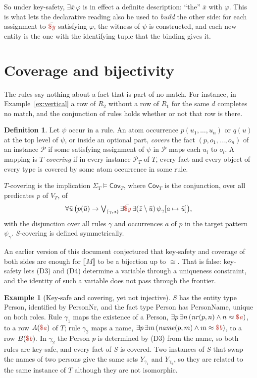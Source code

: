 \documentclass[11pt]{amsart}
\theoremstyle{definition}
\newtheorem{definition}{Definition}
\newtheorem{example}{Example}
\theoremstyle{remark}
\newcommand{\pop}{\mathcal{P}}
\newcommand{\sem}[1]{\llbracket #1 \rrbracket}
\newcommand{\dataEq}{\mathrel{\approx}}
\newcommand{\fv}[1]{\textcolor{BrickRed}{\$\mathit{#1}}}
\newcommand{\Cov}{\mathsf{Cov}}
\begin{document}
So under key-safety, $\exists \bar x\,\varphi$ is in effect a definite
description: ``the'' $\bar x$ with $\varphi$. This is what lets the
declarative reading also be used to \emph{build} the other side: for each
assignment to $\bar{\fv{y}}$ satisfying $\varphi$, the witness of $\psi$
is constructed, and each new entity is the one with the identifying tuple
that the binding gives it.

\section{Coverage and bijectivity}
\label{sec:coverage}

The rules say nothing about a fact that is part of no match. For instance,
in Example~\ref{ex:vertical} a row of $R_2$ without a row of $R_1$ for the
same $d$ completes no match, and the conjunction of rules holds whether or
not that row is there.

\begin{definition}
Let $\psi$ occur in a rule. An atom occurrence $p(u_1, \ldots, u_n)$ or
$q(u)$ at the top level of $\psi$, or inside an optional part, \emph{covers}
the fact $(p, o_1, \ldots, o_n)$ of an instance $\pop$ if some satisfying
assignment of $\psi$ in $\pop$ maps each $u_i$ to $o_i$. A mapping is
\emph{$T$-covering} if in every instance $\pop_T$ of $T$, every fact and
every object of every type is covered by some atom occurrence in some rule.
\end{definition}

$T$-covering is the implication $\Sigma_T \models \Cov_T$, where $\Cov_T$
is the conjunction, over all predicates $p$ of $V_T$, of
$$\forall \bar u\, \big( p(\bar u) \to \textstyle\bigvee_{(\gamma, a)}
  \exists \bar{\fv{y}}\, \exists (\bar z \setminus \bar u)\, \psi_\gamma
  [a \mapsto \bar u] \big),$$
with the disjunction over all rules $\gamma$ and occurrences $a$ of $p$ in
the target pattern $\psi_\gamma$. $S$-covering is defined symmetrically.

An earlier version of this document conjectured that key-safety and
coverage of both sides are enough for $\sem{M}$ to be a bijection up to
$\cong$. That is false: key-safety lets (D3) and (D4) determine a variable
through a uniqueness constraint, and the identity of such a variable does
not pass through the frontier.

\begin{example}[Key-safe and covering, yet not injective]
\label{ex:notinjective}
$S$ has the entity type Person, identified by PersonNr, and the fact type
Person has PersonName, unique on both roles. Rule $\gamma_1$ maps the
existence of a Person, $\exists p\, \exists n\, (\mathit{nr}(p, n) \wedge
n \dataEq \fv{a})$, to a row $A(\fv{a})$ of $T$; rule $\gamma_2$ maps a
name, $\exists p\, \exists m\, (\mathit{name}(p, m) \wedge m \dataEq
\fv{b})$, to a row $B(\fv{b})$. In $\gamma_2$ the Person $p$ is
determined by (D3) from the name, so both rules are key-safe, and every
fact of $S$ is covered. Two instances of $S$ that swap the names of two
persons give the same sets $Y_{\gamma_1}$ and $Y_{\gamma_2}$, so they are
related to the same instance of $T$ although they are not isomorphic.
\end{example}
\end{document}

